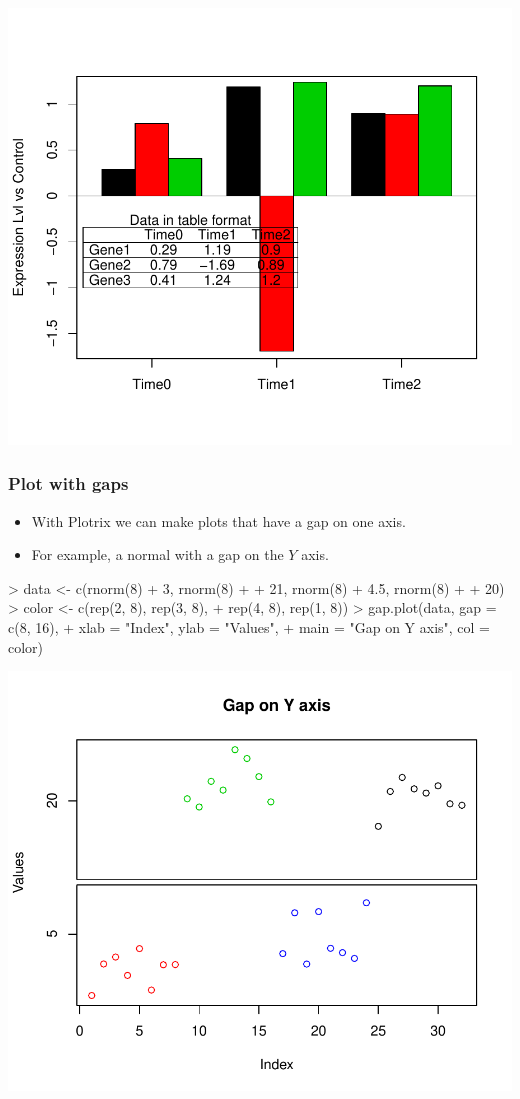 \begin{frame}
\includegraphics{plots/fig-025}
\end{frame}

\begin{frame}
  \frametitle{Plot with gaps}
  \begin{itemize}
  \item With Plotrix we can make plots that have a gap on one axis.
  \item For example, a normal  with a gap on the $Y$ axis.
  \end{itemize}
\begin{Schunk}
\begin{Sinput}
> data <- c(rnorm(8) + 3, rnorm(8) + 
+     21, rnorm(8) + 4.5, rnorm(8) + 
+     20)
> color <- c(rep(2, 8), rep(3, 8), 
+     rep(4, 8), rep(1, 8))
> gap.plot(data, gap = c(8, 16), 
+     xlab = "Index", ylab = "Values", 
+     main = "Gap on Y axis", col = color)
\end{Sinput}
\end{Schunk}
\includegraphics{plots/fig-026}
\end{frame}

